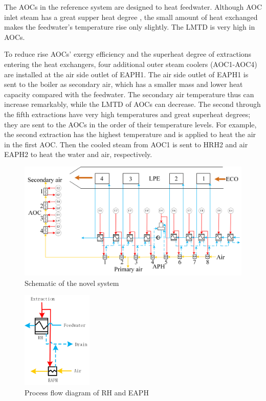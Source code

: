 \documentclass[preprint,12pt]{elsarticle}
\begin{document}
The AOCs in the reference system are designed to heat feedwater.
Although AOC inlet steam has a great supper heat degree %
, the small amount of heat exchanged makes the feedwater's temperature rise only slightly.
The LMTD is very high in AOCs.

To reduce rise AOCs' exergy efficiency and the superheat degree of extractions entering the heat exchangers,
four additional outer steam coolers (AOC1-AOC4) are installed at the air side outlet of EAPH1.
The air side outlet of EAPH1 is sent to the boiler as secondary air, which has a smaller mass and lower heat capacity compared with the feedwater. 
The secondary air temperature thus can increase remarkably, while the LMTD of AOCs can decrease.
The second through the fifth extractions have very high temperatures and great superheat degrees; they are sent to the AOCs in the order of their temperature levels.
For example, the second extraction has the highest temperature and is applied to heat the air in the first AOC. Then the cooled steam from AOC1 is sent to HRH2 and air EAPH2 to heat the water and air, respectively.  %

\begin{figure}[htbp]
\centering
\includegraphics[width=1\textwidth]{fig/novel_system.png}
\caption{Schematic of the novel system} 
\label{fig:novel_system}
\end{figure}

\begin{figure}[htbp]
\centering
\includegraphics[width=0.3\textwidth]{fig/extracion_heat_APH.png}%
\caption{Process flow diagram of RH and EAPH} 
\label{fig:extraction_heat_APH}
\end{figure}
\end{document}
